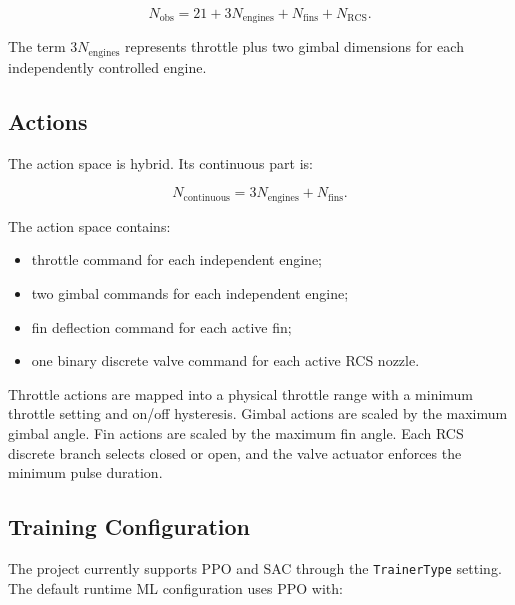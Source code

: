 \documentclass[12pt,a4paper]{article}
\begin{document}
\begin{equation}
N_{\mathrm{obs}} = 21 + 3N_{\mathrm{engines}} + N_{\mathrm{fins}} + N_{\mathrm{RCS}}.
\end{equation}

The term \(3N_{\mathrm{engines}}\) represents throttle plus two gimbal dimensions for each independently controlled engine.

\subsection{Actions}

The action space is hybrid. Its continuous part is:

\begin{equation}
N_{\mathrm{continuous}} = 3N_{\mathrm{engines}} + N_{\mathrm{fins}}.
\end{equation}

The action space contains:

\begin{itemize}
    \item throttle command for each independent engine;
    \item two gimbal commands for each independent engine;
    \item fin deflection command for each active fin;
    \item one binary discrete valve command for each active RCS nozzle.
\end{itemize}

Throttle actions are mapped into a physical throttle range with a minimum throttle setting and on/off hysteresis. Gimbal actions are scaled by the maximum gimbal angle. Fin actions are scaled by the maximum fin angle. Each RCS discrete branch selects closed or open, and the valve actuator enforces the minimum pulse duration.

\subsection{Training Configuration}

The project currently supports PPO and SAC through the \texttt{TrainerType} setting. The default runtime ML configuration uses PPO with:
\end{document}
